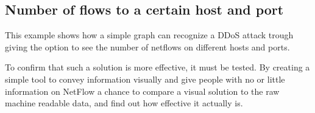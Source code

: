 \subsection{Number of flows to a certain host and port}
This example shows how a simple graph can recognize a DDoS attack trough giving the option to see the number of netflows on different hosts and ports. 


To confirm that such a solution is more effective, it must be tested. By creating a simple tool to convey information visually and give people with no or little information on NetFlow a chance to compare a visual solution to the raw machine readable data, and find out how effective it actually is.  


